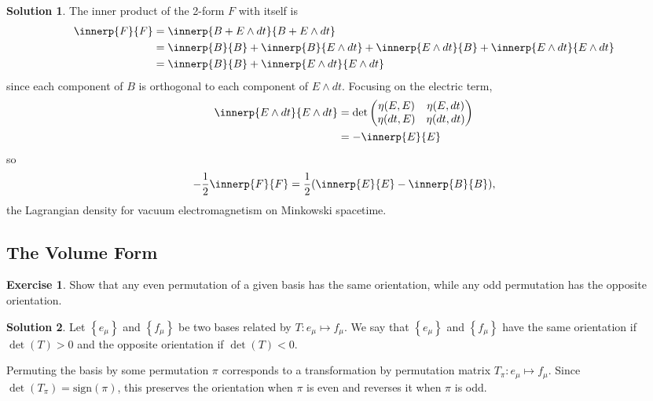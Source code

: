 \documentclass[11pt, a4paper]{article}
\theoremstyle{definition}
\newtheorem{ex}{Exercise}[part]
\newtheorem{sol}{Solution}[part]
\begin{document}
\begin{sol}

The inner product of the 2-form $F$ with itself is
\begin{align*}
    \innerp{F}{F} &= \innerp{B + E \wedge dt}{B + E \wedge dt} \\
        &= \innerp{B}{B} + \innerp{B}{E \wedge dt} + \innerp{E \wedge dt}{B} + \innerp{E \wedge dt}{E \wedge dt} \\
        &= \innerp{B}{B} + \innerp{E \wedge dt}{E \wedge dt}
\end{align*}
since each component of $B$ is orthogonal to each component of $E \wedge dt$.
Focusing on the electric term,
\begin{align*}
    \innerp{E \wedge dt}{E \wedge dt} &= \det \begin{pmatrix}
                \eta(E, E) & \eta(E, dt) \\
                \eta(dt, E) & \eta(dt, dt)
            \end{pmatrix} \\
        &= -\innerp{E}{E}
\end{align*}
so
\[
    -\frac{1}{2} \innerp{F}{F} = \frac{1}{2}(\innerp{E}{E} - \innerp{B}{B}),
\]
the Lagrangian density for vacuum electromagnetism on Minkowski spacetime.

\end{sol}

\subsection{The Volume Form}

\begin{ex}

Show that any even permutation of a given basis has the same orientation, while any odd permutation has the opposite orientation.

\end{ex}

\begin{sol}

Let $\left\{e_\mu\right\}$ and $\left\{f_\mu\right\}$ be two bases related by $T: e_\mu \mapsto f_\mu$. We say that $\left\{e_\mu\right\}$ and $\left\{f_\mu\right\}$ have the same orientation if $\det(T) > 0$ and the opposite orientation if $\det(T) < 0$.

Permuting the basis by some permutation $\pi$ corresponds to a transformation by permutation matrix $T_\pi: e_\mu \mapsto f_\mu$. Since $\det(T_\pi) = \text{sign}(\pi)$, this preserves the orientation when $\pi$ is even and reverses it when $\pi$ is odd.

\end{sol}
\end{document}
